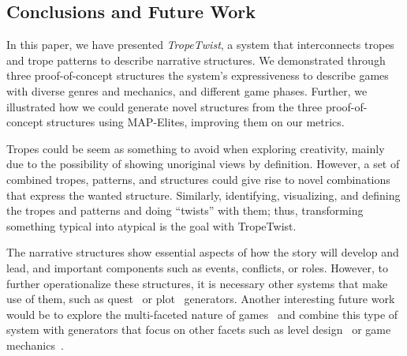 \subsection{Conclusions and Future Work}


In this paper, we have presented \emph{TropeTwist}, a system that interconnects tropes and trope patterns to describe narrative structures. We demonstrated through three proof-of-concept structures the system's expressiveness to describe games with diverse genres and mechanics, and different game phases. Further, we illustrated how we could generate novel structures from the three proof-of-concept structures using MAP-Elites, improving them on our metrics. 

Tropes could be seem as something to avoid when exploring creativity, mainly due to the possibility of showing unoriginal views by definition. However, a set of combined tropes, patterns, and structures could give rise to novel combinations that express the wanted structure. Similarly, identifying, visualizing, and defining the tropes and patterns and doing ``twists'' with them; thus, transforming something typical into atypical is the goal with TropeTwist.

The narrative structures show essential aspects of how the story will develop and lead, and important components such as events, conflicts, or roles. However, to further operationalize these structures, it is necessary other systems that make use of them, such as quest~\cite{p12Alvarez2021-questgram,ammanabrolu2019-towardQuestGeneration} or plot~\cite{p12Ammanabrolu2020-PlotEventsSentences} generators. Another interesting future work would be to explore the multi-faceted nature of games~\cite{p12Liapis2019-OrchestratingGames} and combine this type of system with generators that focus on other facets such as level design~\cite{p12sarkar2021-dungeonPlatformer,alvarez2019empowering} or game mechanics~\cite{p12green2021-gamemechanicsAlignment,charity2020mech}.

